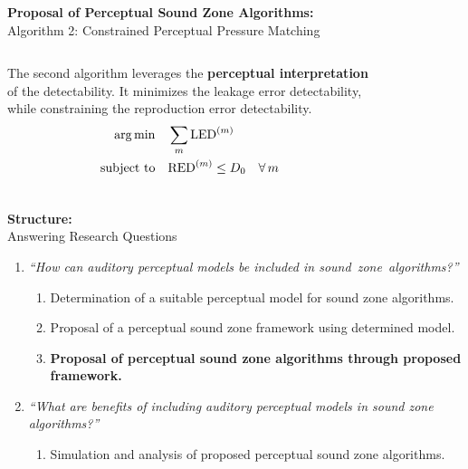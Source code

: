 \documentclass[aspectratio=169]{beamer}
\begin{document}
\begin{frame}{\textbf{Proposal of Perceptual Sound Zone Algorithms:}\\ Algorithm 2: Constrained Perceptual Pressure
    Matching}
    \begin{columns}[c]
        The second algorithm leverages the \textbf{perceptual interpretation} of the detectability.
        It minimizes the leakage error detectability, while constraining the reproduction error detectability.
        \begin{align}
            \begin{aligned}
                \operatorname*{arg\,min}_{}\quad &\sum_m \text{LED}^{(m)}\\
                \operatorname*{subject\,\,to}\quad &\text{RED}^{(m)} \leq D_0 \quad \forall\,m
            \end{aligned}
        \end{align}
        \begin{figure}[]
            \centering
            \scalebox{0.7}{}
        \end{figure}
    \end{columns}
\end{frame}

\begin{frame}{\textbf{Structure:}\\ Answering Research Questions}
    \begin{enumerate}
        \item {\textit{``How can auditory perceptual models be included in sound~zone~algorithms?''}}
            \vspace{7pt}
            \begin{enumerate}
                \item Determination of a suitable perceptual model for sound zone algorithms.
                \vspace{7pt}
                \item Proposal of a perceptual sound zone framework using determined model. 
                \vspace{7pt}
                \item \textbf{Proposal of perceptual sound zone algorithms through proposed framework.}
                \vspace{7pt}
            \end{enumerate}
        \item {\textit{``What are benefits of including auditory perceptual models in sound zone algorithms?''}}
            \vspace{-5pt}
            \begin{enumerate}
                \item Simulation and analysis of proposed perceptual sound zone algorithms.
            \end{enumerate}
    \end{enumerate}
\end{frame}
\end{document}
